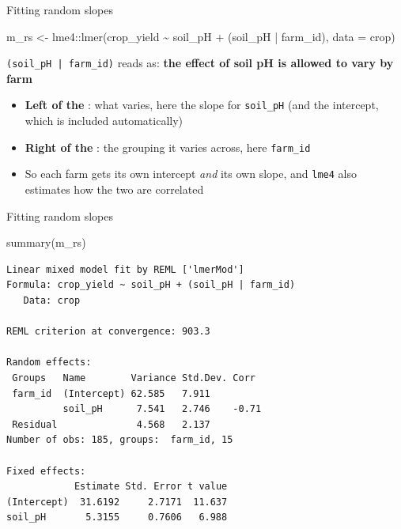 \documentclass[
  ignorenonframetext,
  aspectratio=169,
]{beamer}
\newenvironment{Shaded}{\begin{snugshade}}{\end{snugshade}}
\newcommand{\AttributeTok}[1]{\textcolor[rgb]{0.40,0.45,0.13}{#1}}
\newcommand{\FunctionTok}[1]{\textcolor[rgb]{0.28,0.35,0.67}{#1}}
\newcommand{\NormalTok}[1]{\textcolor[rgb]{0.00,0.23,0.31}{#1}}
\newcommand{\OtherTok}[1]{\textcolor[rgb]{0.00,0.23,0.31}{#1}}
\newcommand{\SpecialCharTok}[1]{\textcolor[rgb]{0.37,0.37,0.37}{#1}}
\providecommand{\tightlist}{%
  \setlength{\itemsep}{0pt}\setlength{\parskip}{0pt}}\usepackage{longtable,booktabs,array}
\begin{document}
\begin{frame}[fragile]{Fitting random slopes}
\label{fitting-random-slopes}
\begin{Shaded}
\begin{Highlighting}[]
\NormalTok{m\_rs }\OtherTok{\textless{}{-}}\NormalTok{ lme4}\SpecialCharTok{::}\FunctionTok{lmer}\NormalTok{(crop\_yield }\SpecialCharTok{\textasciitilde{}}\NormalTok{ soil\_pH }\SpecialCharTok{+}\NormalTok{ (soil\_pH }\SpecialCharTok{|}\NormalTok{ farm\_id),}
             \AttributeTok{data =}\NormalTok{ crop)}
\end{Highlighting}
\end{Shaded}

\pause

\begin{center}
\texttt{(soil\_pH | farm\_id)} reads as: \textbf{the effect of soil pH is allowed to vary by farm}
\end{center}

\small

\begin{itemize}
\tightlist
\item
  \textbf{Left of the \texttt{\textbar{}}}: what varies, here the slope
  for \texttt{soil\_pH} (and the intercept, which is included
  automatically)
\item
  \textbf{Right of the \texttt{\textbar{}}}: the grouping it varies
  across, here \texttt{farm\_id}
\item
  So each farm gets its own intercept \emph{and} its own slope, and
  \texttt{lme4} also estimates how the two are correlated
\end{itemize}

\normalsize
\end{frame}

\begin{frame}[fragile]{Fitting random slopes}
\label{fitting-random-slopes-1}
\begin{Shaded}
\begin{Highlighting}[]
\FunctionTok{summary}\NormalTok{(m\_rs)}
\end{Highlighting}
\end{Shaded}

\begin{center}\begin{minipage}{0.8\linewidth}
\begin{Verbatim}[fontsize=\scriptsize]
Linear mixed model fit by REML ['lmerMod']
Formula: crop_yield ~ soil_pH + (soil_pH | farm_id)
   Data: crop

REML criterion at convergence: 903.3

Random effects:
 Groups   Name        Variance Std.Dev. Corr  
 farm_id  (Intercept) 62.585   7.911          
          soil_pH      7.541   2.746    -0.71 
 Residual              4.568   2.137          
Number of obs: 185, groups:  farm_id, 15

Fixed effects:
            Estimate Std. Error t value
(Intercept)  31.6192     2.7171  11.637
soil_pH       5.3155     0.7606   6.988
\end{Verbatim}
\end{minipage}\end{center}
\end{frame}
\end{document}
